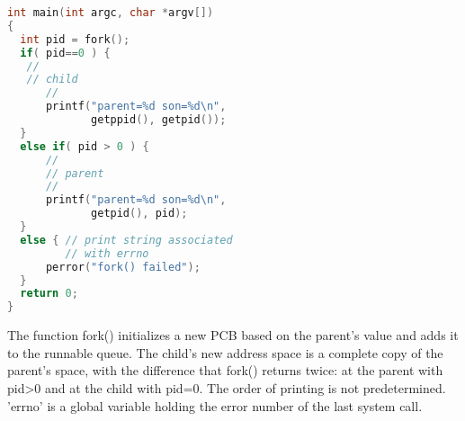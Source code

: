 \documentclass[12pt]{report}
\begin{document}
\begin{lstlisting}[language=C]
int main(int argc, char *argv[])
{
  int pid = fork();
  if( pid==0 ) { 
   //
   // child
      //
      printf("parent=%d son=%d\n",
             getppid(), getpid());
  }
  else if( pid > 0 ) {
      //
      // parent
      //
      printf("parent=%d son=%d\n",
             getpid(), pid);
  }
  else { // print string associated
         // with errno   
      perror("fork() failed"); 
  }
  return 0;
}
\end{lstlisting}
\begin{tcolorbox}[colback=yellow!5, colframe=yellow!80!black, title={\faBookmark À retenir}]
The function fork() initializes a new PCB based on the parent's value and adds it to the runnable queue. The child's new address space is a complete copy of the parent's space, with the difference that fork() returns twice: at the parent with pid>0 and at the child with pid=0. The order of printing is not predetermined. 'errno' is a global variable holding the error number of the last system call.
\end{tcolorbox}
\end{document}
